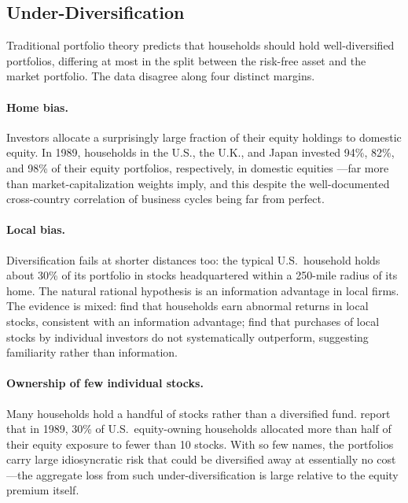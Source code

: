 \subsection{Under-Diversification}
\label{sec:diversification}

Traditional portfolio theory predicts that households should hold well-diversified portfolios, differing at most in the split between the risk-free asset and the market portfolio. The data disagree along four distinct margins.

\paragraph{Home bias.}
Investors allocate a surprisingly large fraction of their equity holdings to domestic equity. In 1989, households in the U.S., the U.K., and Japan invested 94\%, 82\%, and 98\% of their equity portfolios, respectively, in domestic equities \citep{french1991}---far more than market-capitalization weights imply, and this despite the well-documented cross-country correlation of business cycles being far from perfect.

\paragraph{Local bias.}
Diversification fails at shorter distances too: the typical U.S.\ household holds about 30\% of its portfolio in stocks headquartered within a 250-mile radius of its home. The natural rational hypothesis is an information advantage in local firms. The evidence is mixed: \citet{ivkovic2005} find that households earn abnormal returns in local stocks, consistent with an information advantage; \citet{seasholes2010} find that purchases of local stocks by individual investors do not systematically outperform, suggesting familiarity rather than information.

\paragraph{Ownership of few individual stocks.}
Many households hold a handful of stocks rather than a diversified fund. \citet{curcuru2004} report that in 1989, 30\% of U.S.\ equity-owning households allocated more than half of their equity exposure to fewer than 10 stocks. With so few names, the portfolios carry large idiosyncratic risk that could be diversified away at essentially no cost---the aggregate loss from such under-diversification is large relative to the equity premium itself.

